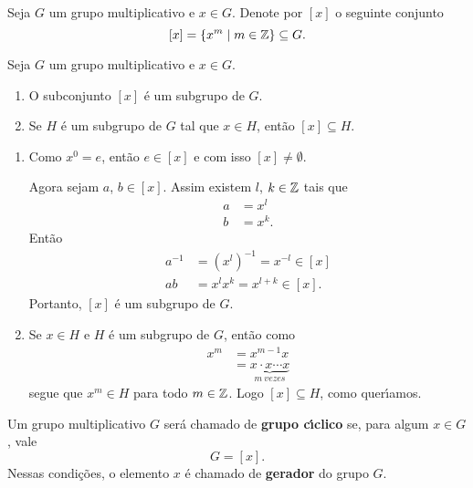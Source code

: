 \begin{definicao}
	Seja $G$ um grupo multiplicativo e $x \in G$. Denote por $[x]$ o seguinte conjunto
	\[
	    [x] = \{x^m \mid m \in \mathbb{Z}\} \subseteq G.
	\]	
\end{definicao}

\begin{proposicao}
    Seja $G$ um grupo multiplicativo e $x \in G$.
    \begin{enumerate}[label={\roman*})]
        \item O subconjunto $[x]$ \'e um subgrupo de $G$.

        \item Se $H$ \'e um subgrupo de $G$ tal que $x \in H$, ent\~ao $[x] \subseteq H$.
    \end{enumerate}
\end{proposicao}
\begin{prova}
	\begin{enumerate}[label={\roman*})]
		\item Como $x^0 = e$, ent\~ao $e \in [x]$ e com isso $[x] \ne \emptyset$.

		Agora sejam $a$, $b \in [x]$. Assim existem $l$, $k \in \mathbb{Z}$ tais que
		\begin{align*}
			a &= x^l\\
			b &= x^k.
		\end{align*}
		Ent\~ao
		\begin{align*}
			a^{-1} &= (x^l)^{-1} = x^{-l} \in [x]\\
			ab &= x^lx^k = x^{l + k} \in [x].
		\end{align*}
		Portanto, $[x]$ \'e um subgrupo de $G$.

		\item Se $x \in H$ e $H$ \'e um subgrupo de $G$, ent\~ao como
		\begin{align*}
			x^m &=  x^{m-1}x\\
			&=\underbrace{x\cdot x \cdots x}_{m\ vezes}
		\end{align*}
		segue que $x^m \in H$ para todo $m \in \mathbb{Z}$. Logo $[x] \subseteq H$, como quer{\'\i}amos.
	\end{enumerate}
\end{prova}

\begin{definicao}
    Um grupo multiplicativo $G$ ser\'a chamado de \textbf{grupo c{\'\i}clico} se, para algum $x \in G$, vale
    \[
        G = [x].
    \]
    Nessas condi\c{c}\~oes, o elemento $x$  \'e chamado de \textbf{gerador} do grupo $G$.
\end{definicao}


